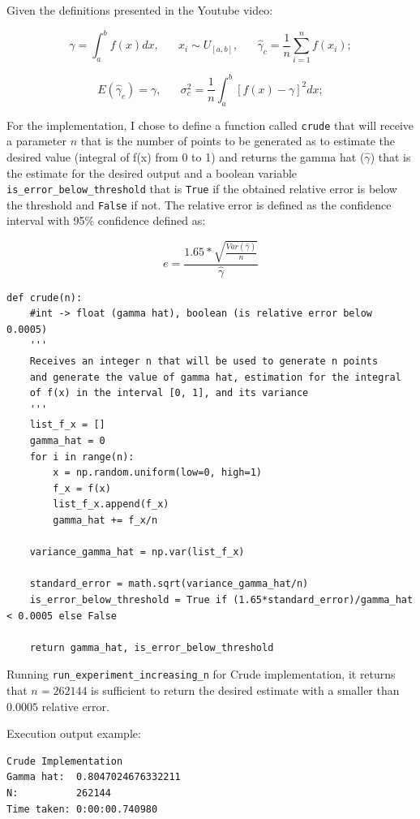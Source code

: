 \documentclass{homework}
\begin{document}
Given the definitions presented in the Youtube video:

\begin{equation}
    \gamma = \int_a^b f(x)dx, \;\;\;\;\;\; x_i \sim U_{[a, b]}, \;\;\;\;\;\; \hat \gamma_c = \frac{1}{n}\sum_{i=1}^n f(x_i);
\end{equation}

\begin{equation}
    E(\hat \gamma_c) = \gamma, \;\;\;\;\;\; \sigma_c^2 = \frac{1}{n}\int_a^b[f(x) - \gamma]^2dx;
\end{equation}

For the implementation, I chose to define a function called \verb|crude| that will receive a parameter $n$ that is the number of points to be generated as to estimate the desired value (integral of f(x) from 0 to 1) and returns the gamma hat ($\hat \gamma$) that is the estimate for the desired output and a boolean variable \verb|is_error_below_threshold| that is \verb|True| if the obtained relative error is below the threshold and \verb|False| if not. The relative error is defined as the confidence interval with 95\% confidence defined as:

\begin{equation}
e = \frac{1.65*\sqrt{\frac{Var(\hat \gamma)}{n}}}{\hat \gamma}
\end{equation}

\begin{lstlisting}
def crude(n):
	#int -> float (gamma hat), boolean (is relative error below 0.0005)
	'''
	Receives an integer n that will be used to generate n points
	and generate the value of gamma hat, estimation for the integral
	of f(x) in the interval [0, 1], and its variance
	'''
	list_f_x = []
	gamma_hat = 0
	for i in range(n):
		x = np.random.uniform(low=0, high=1)
		f_x = f(x)
		list_f_x.append(f_x)
		gamma_hat += f_x/n

	variance_gamma_hat = np.var(list_f_x)

	standard_error = math.sqrt(variance_gamma_hat/n)
	is_error_below_threshold = True if (1.65*standard_error)/gamma_hat < 0.0005 else False

	return gamma_hat, is_error_below_threshold
\end{lstlisting}

Running \verb|run_experiment_increasing_n| for Crude implementation, it returns that $n = 262144$ is sufficient to return the desired estimate with a smaller than $0.0005$ relative error.

Execution output example:
\begin{lstlisting}
Crude Implementation
Gamma hat:  0.8047024676332211
N:          262144
Time taken: 0:00:00.740980
\end{lstlisting}
\end{document}
